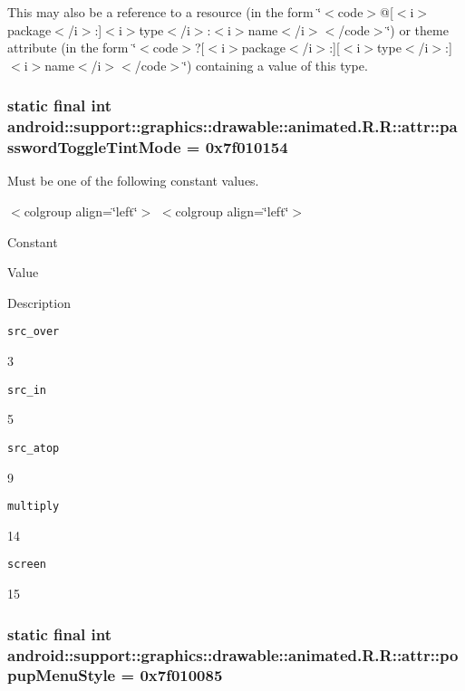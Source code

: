 This may also be a reference to a resource (in the form \char`\"{}$<$code$>$@\mbox{[}$<$i$>$package$<$/i$>$:\mbox{]}$<$i$>$type$<$/i$>$:$<$i$>$name$<$/i$>$$<$/code$>$\char`\"{}) or theme attribute (in the form \char`\"{}$<$code$>$?\mbox{[}$<$i$>$package$<$/i$>$:\mbox{]}\mbox{[}$<$i$>$type$<$/i$>$:\mbox{]}$<$i$>$name$<$/i$>$$<$/code$>$\char`\"{}) containing a value of this type. \hypertarget{classandroid_1_1support_1_1graphics_1_1drawable_1_1animated_1_1_r_1_1attr_f7fc1e93155fdaf03f2344ddf34e47b2}{
\subsubsection[{passwordToggleTintMode}]{\setlength{\rightskip}{0pt plus 5cm}static final int android::support::graphics::drawable::animated.R.R::attr::passwordToggleTintMode = 0x7f010154}}
\label{classandroid_1_1support_1_1graphics_1_1drawable_1_1animated_1_1_r_1_1attr_f7fc1e93155fdaf03f2344ddf34e47b2}


Must be one of the following constant values. \begin{TabularC}{0}
\hline
\end{TabularC}
$<$colgroup align=\char`\"{}left\char`\"{}$>$ $<$colgroup align=\char`\"{}left\char`\"{}$>$ 

Constant

Value

Description 

{\tt src\_\-over}

3

{\tt src\_\-in}

5

{\tt src\_\-atop}

9

{\tt multiply}

14

{\tt screen}

15\hypertarget{classandroid_1_1support_1_1graphics_1_1drawable_1_1animated_1_1_r_1_1attr_3cea557f3aab04cd234ac591934e7f3e}{
\subsubsection[{popupMenuStyle}]{\setlength{\rightskip}{0pt plus 5cm}static final int android::support::graphics::drawable::animated.R.R::attr::popupMenuStyle = 0x7f010085}}
\label{classandroid_1_1support_1_1graphics_1_1drawable_1_1animated_1_1_r_1_1attr_3cea557f3aab04cd234ac591934e7f3e}



